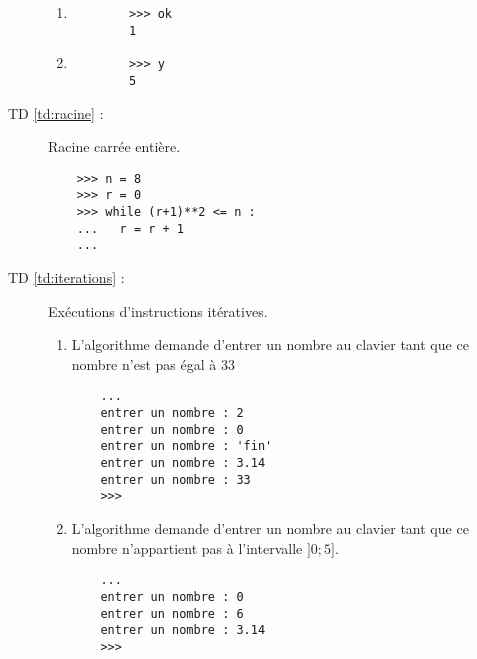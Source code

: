 \begin{description}
\begin{enumerate}
	\item 

		\begin{py}{12cm}
		\begin{verbatim}
		>>> ok
		1
		\end{verbatim}
		\end{py}

	\item 

		\begin{py}{12cm}
		\begin{verbatim}
		>>> y
		5
		\end{verbatim}
		\end{py}

	\end{enumerate}

\item[TD \ref{td:racine} :] Racine carrée entière.

	\begin{py}{12cm}
	\begin{verbatim}
	>>> n = 8
	>>> r = 0
	>>> while (r+1)**2 <= n :
	...   r = r + 1
	... 
	\end{verbatim}
	\end{py}

\item[TD \ref{td:iterations} :] Exécutions d'instructions itératives.\\
	\begin{minipage}[t]{7.5cm}
	\begin{enumerate}
	\item L'algorithme demande d'entrer un nombre au clavier tant que ce nombre
		n'est pas égal à 33

	\begin{py}{12cm}
	\begin{verbatim}
	...
	entrer un nombre : 2
	entrer un nombre : 0
	entrer un nombre : 'fin'
	entrer un nombre : 3.14
	entrer un nombre : 33
	>>> 
	\end{verbatim}
	\end{py}

	\item L'algorithme demande d'entrer un nombre au clavier tant que ce nombre
		n'appartient pas à l'intervalle $]0;5]$.

	\begin{py}{12cm}
	\begin{verbatim}
	...  
	entrer un nombre : 0
	entrer un nombre : 6
	entrer un nombre : 3.14
	>>> 
	\end{verbatim}
	\end{py}


\end{enumerate}
\end{minipage}
\end{description}
